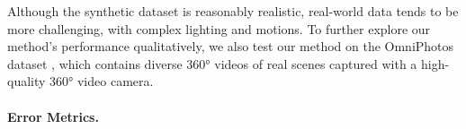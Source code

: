 Although the synthetic dataset is reasonably realistic, real-world data tends to be more challenging, with complex lighting and motions.
%
To further explore our method's performance qualitatively, we also test our method on the OmniPhotos dataset \cite{BerteYLR2020}, which contains diverse 360° videos of real scenes captured with a high-quality 360° video camera.

\vspace{-1em}
\paragraph{Error Metrics.}

